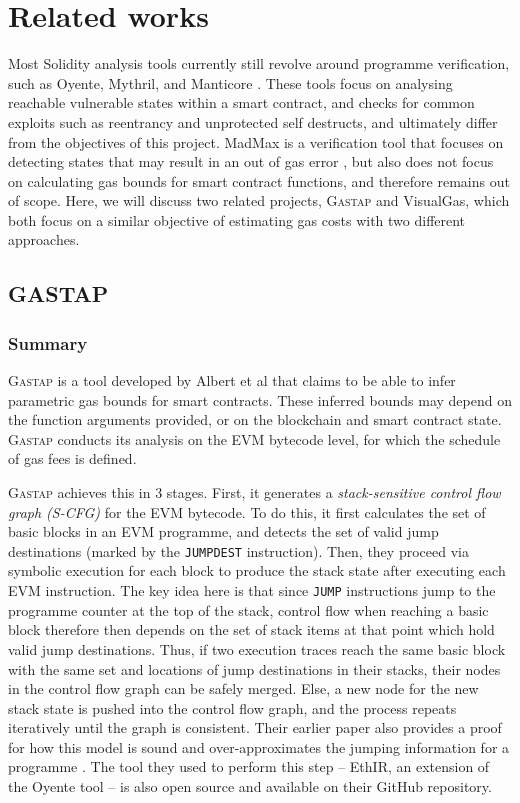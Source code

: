 \chapter{Related works}
\label{chap:related}

Most Solidity analysis tools currently still revolve around programme verification, such 
as Oyente, Mythril, and Manticore \cite{oyente} \cite{mythril} \cite{manticore}. These tools focus on analysing reachable vulnerable
states within a smart contract, and checks for common exploits such as reentrancy and unprotected
self destructs, and ultimately differ from the objectives of this project. MadMax is a
verification tool that focuses on detecting states that may result in an out of gas error \cite{madmax}, but
also does not focus on calculating gas bounds for smart contract functions, and therefore
remains out of scope. Here, we will discuss two related projects, \textsc{Gastap} and VisualGas, which
both focus on a similar objective of estimating gas costs with two different approaches.

\section{GASTAP}

\subsection{Summary}

\textsc{Gastap} is a tool developed by Albert et al \cite{dontrunonfumes} that claims to be able to
infer parametric gas bounds for smart contracts. These inferred bounds may depend on the
function arguments provided, or on the blockchain and smart contract state. \textsc{Gastap} conducts
its analysis on the EVM bytecode level, for which the schedule of gas fees is defined.

\textsc{Gastap} achieves this in 3 stages. First, it generates a \textit{stack-sensitive control flow graph (S-CFG)}
for the EVM bytecode. To do this, it first calculates the set of basic blocks in an EVM programme,
and detects the set of valid jump destinations (marked by the \texttt{JUMPDEST} instruction). Then,
they proceed via symbolic execution for each block to produce the stack state after executing each EVM instruction.
The key idea here is that since \texttt{JUMP} instructions jump to the programme counter at the 
top of the stack, control flow when reaching a basic block therefore then depends on the set 
of stack items at that point which hold valid jump destinations. Thus, if two execution traces
reach the same basic block with the same set and locations of jump destinations in their stacks, 
their nodes in the control flow graph can be safely merged. Else, a new node for the new stack
state is pushed into the control flow graph, and the process repeats iteratively until the graph
is consistent. Their earlier paper also provides a proof for how this model is sound and over-approximates 
the jumping information for a programme \cite{constructcfg}. The tool they used to perform this step -- 
EthIR, an extension of the Oyente tool -- is also open source and available on their GitHub repository.

